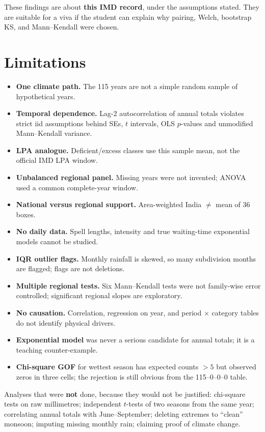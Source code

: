 \documentclass[
]{article}
\providecommand{\tightlist}{%
  \setlength{\itemsep}{0pt}\setlength{\parskip}{0pt}}
\begin{document}
These findings are about \textbf{this IMD record}, under the assumptions
stated. They are suitable for a viva if the student can explain why
pairing, Welch, bootstrap KS, and Mann--Kendall were chosen.

\section{Limitations}\label{limitations}

\begin{itemize}
\tightlist
\item
  \textbf{One climate path.} The 115 years are not a simple random
  sample of hypothetical years.
\item
  \textbf{Temporal dependence.} Lag-2 autocorrelation of annual totals
  violates strict iid assumptions behind SEs, \(t\) intervals, OLS
  \(p\)-values and unmodified Mann--Kendall variance.
\item
  \textbf{LPA analogue.} Deficient/excess classes use this sample mean,
  not the official IMD LPA window.
\item
  \textbf{Unbalanced regional panel.} Missing years were not invented;
  ANOVA used a common complete-year window.
\item
  \textbf{National versus regional support.} Area-weighted India
  \(\neq\) mean of 36 boxes.
\item
  \textbf{No daily data.} Spell lengths, intensity and true waiting-time
  exponential models cannot be studied.
\item
  \textbf{IQR outlier flags.} Monthly rainfall is skewed, so many
  subdivision months are flagged; flags are not deletions.
\item
  \textbf{Multiple regional tests.} Six Mann--Kendall tests were not
  family-wise error controlled; significant regional slopes are
  exploratory.
\item
  \textbf{No causation.} Correlation, regression on year, and period
  \(\times\) category tables do not identify physical drivers.
\item
  \textbf{Exponential model} was never a serious candidate for annual
  totals; it is a teaching counter-example.
\item
  \textbf{Chi-square GOF} for wettest season has expected counts \(>5\)
  but observed zeros in three cells; the rejection is still obvious from
  the 115--0--0--0 table.
\end{itemize}

Analyses that were \textbf{not} done, because they would not be
justified: chi-square tests on raw millimetres; independent \(t\)-tests
of two seasons from the same year; correlating annual totals with
June--September; deleting extremes to ``clean'' monsoon; imputing
missing monthly rain; claiming proof of climate change.
\end{document}
